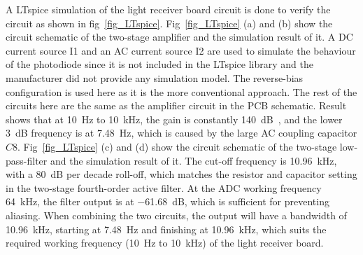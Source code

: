 A LTspice simulation of the light receiver board circuit is done to verify the circuit as shown in fig~\ref{fig_LTspice}.  Fig~\ref{fig_LTspice} (a) and (b) show the circuit schematic of the two-stage amplifier and the simulation result of it.  A DC current source I1 and an AC current source I2 are used to simulate the behaviour of the photodiode since it is not included in the LTspice library and the manufacturer did not provide any simulation model.  The reverse-bias configuration is used here as it is the more conventional approach.  The rest of the circuits here are the same as the amplifier circuit in the PCB schematic.  Result shows that at \qty{10}{Hz} to \qty{10}{kHz}, the gain is constantly \qty{140}{dB\Omega}, and the lower \qty{3}{dB} frequency is at \qty{7.48}{Hz}, which is caused by the large AC coupling capacitor $C8$.  Fig~\ref{fig_LTspice} (c) and (d) show the circuit schematic of the two-stage low-pass-filter and the simulation result of it.  The cut-off frequency is \qty{10.96}{kHz}, with a \qty{80}{dB} per decade roll-off, which matches the resistor and capacitor setting in the two-stage fourth-order active filter.  At the ADC working frequency \qty{64}{kHz}, the filter output is at \qty{-61.68}{dB}, which is sufficient for preventing aliasing.  When combining the two circuits, the output will have a bandwidth of \qty{10.96}{kHz}, starting at \qty{7.48}{Hz} and finishing at \qty{10.96}{kHz}, which suits the required working frequency (\qty{10}{Hz} to \qty{10}{kHz}) of the light receiver board.

